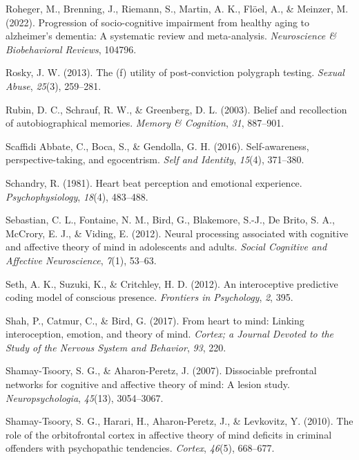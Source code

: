 \documentclass[
  man,mask,floatsintext]{apa6}
\newlength{\cslhangindent}
\newenvironment{CSLReferences}[2] %
 {\begin{list}{}{%
  \setlength{\itemindent}{0pt}
  \setlength{\leftmargin}{0pt}
  \setlength{\parsep}{0pt}
  \ifodd #1
   \setlength{\leftmargin}{\cslhangindent}
   \setlength{\itemindent}{-1\cslhangindent}
  \fi
  \setlength{\itemsep}{#2\baselineskip}}}
 {\end{list}}
\begin{document}
\begin{CSLReferences}{1}{0}
Roheger, M., Brenning, J., Riemann, S., Martin, A. K., Flöel, A., \& Meinzer, M. (2022). Progression of socio-cognitive impairment from healthy aging to alzheimer's dementia: A systematic review and meta-analysis. \emph{Neuroscience \& Biobehavioral Reviews}, 104796.

Rosky, J. W. (2013). The (f) utility of post-conviction polygraph testing. \emph{Sexual Abuse}, \emph{25}(3), 259--281.

Rubin, D. C., Schrauf, R. W., \& Greenberg, D. L. (2003). Belief and recollection of autobiographical memories. \emph{Memory \& Cognition}, \emph{31}, 887--901.

Scaffidi Abbate, C., Boca, S., \& Gendolla, G. H. (2016). Self-awareness, perspective-taking, and egocentrism. \emph{Self and Identity}, \emph{15}(4), 371--380.

Schandry, R. (1981). Heart beat perception and emotional experience. \emph{Psychophysiology}, \emph{18}(4), 483--488.

Sebastian, C. L., Fontaine, N. M., Bird, G., Blakemore, S.-J., De Brito, S. A., McCrory, E. J., \& Viding, E. (2012). Neural processing associated with cognitive and affective theory of mind in adolescents and adults. \emph{Social Cognitive and Affective Neuroscience}, \emph{7}(1), 53--63.

Seth, A. K., Suzuki, K., \& Critchley, H. D. (2012). An interoceptive predictive coding model of conscious presence. \emph{Frontiers in Psychology}, \emph{2}, 395.

Shah, P., Catmur, C., \& Bird, G. (2017). From heart to mind: Linking interoception, emotion, and theory of mind. \emph{Cortex; a Journal Devoted to the Study of the Nervous System and Behavior}, \emph{93}, 220.

Shamay-Tsoory, S. G., \& Aharon-Peretz, J. (2007). Dissociable prefrontal networks for cognitive and affective theory of mind: A lesion study. \emph{Neuropsychologia}, \emph{45}(13), 3054--3067.

Shamay-Tsoory, S. G., Harari, H., Aharon-Peretz, J., \& Levkovitz, Y. (2010). The role of the orbitofrontal cortex in affective theory of mind deficits in criminal offenders with psychopathic tendencies. \emph{Cortex}, \emph{46}(5), 668--677.


\end{CSLReferences}
\end{document}
